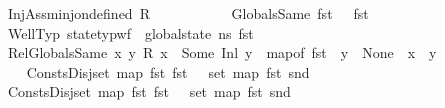 \begin{isabellebody}
\ \ \ \ \ \ \ \ \ \ InjAssm{\isacharcolon}{\kern0pt}{\isachardoublequoteopen}inj{\isacharunderscore}{\kern0pt}on{\isacharunderscore}{\kern0pt}defined\ R{\isachardoublequoteclose}\ \isanewline
\ \ \ \ \ \ \ \ \ \ GlobalsSame{\isacharcolon}{\kern0pt}\ {\isachardoublequoteopen}fst\ {\isasymLambda}\ {\isacharequal}{\kern0pt}\ fst\ {\isasymLambda}{\isacharprime}{\kern0pt}{\isachardoublequoteclose}\ \isanewline
\ \ \ \ \ \ \ \ \ \ WellTyp{\isacharcolon}{\kern0pt}\ {\isachardoublequoteopen}{\isacharparenleft}{\kern0pt}state{\isacharunderscore}{\kern0pt}typ{\isacharunderscore}{\kern0pt}wf\ {\isasymOmega}\ {\isacharparenleft}{\kern0pt}global{\isacharunderscore}{\kern0pt}state\ ns{\isacharparenright}{\kern0pt}\ {\isacharparenleft}{\kern0pt}fst\ {\isasymLambda}{\isacharparenright}{\kern0pt}{\isacharparenright}{\kern0pt}{\isachardoublequoteclose}\ \isanewline
\ \ \ \ \ \ \ \ \ \ RelGlobalsSame{\isacharcolon}{\kern0pt}\ {\isachardoublequoteopen}{\isasymforall}x\ y{\isachardot}{\kern0pt}\ R\ x\ {\isacharequal}{\kern0pt}\ Some\ {\isacharparenleft}{\kern0pt}Inl\ y{\isacharparenright}{\kern0pt}\ {\isasymlongrightarrow}\ map{\isacharunderscore}{\kern0pt}of\ {\isacharparenleft}{\kern0pt}fst\ {\isasymLambda}{\isacharprime}{\kern0pt}{\isacharparenright}{\kern0pt}\ y\ {\isasymnoteq}\ None\ {\isasymlongrightarrow}\ x\ {\isacharequal}{\kern0pt}\ y{\isachardoublequoteclose}\ \ \isanewline
\ \ \ \ \ \ \ \ \ \ ConstsDisj{\isacharcolon}{\kern0pt}{\isachardoublequoteopen}set\ {\isacharparenleft}{\kern0pt}map\ fst\ {\isacharparenleft}{\kern0pt}fst\ {\isasymLambda}{\isacharparenright}{\kern0pt}{\isacharparenright}{\kern0pt}\ {\isasyminter}\ set\ {\isacharparenleft}{\kern0pt}map\ fst\ {\isacharparenleft}{\kern0pt}snd\ {\isasymLambda}{\isacharparenright}{\kern0pt}{\isacharparenright}{\kern0pt}\ {\isacharequal}{\kern0pt}\ {\isacharbraceleft}{\kern0pt}{\isacharbraceright}{\kern0pt}{\isachardoublequoteclose}\ \isanewline
\ \ \ \ \ \ \ \ \ \ ConstsDisj{}{\isacharcolon}{\kern0pt}{\isachardoublequoteopen}set\ {\isacharparenleft}{\kern0pt}map\ fst\ {\isacharparenleft}{\kern0pt}fst\ {\isasymLambda}{\isacharprime}{\kern0pt}{\isacharparenright}{\kern0pt}{\isacharparenright}{\kern0pt}\ {\isasyminter}\ set\ {\isacharparenleft}{\kern0pt}map\ fst\ {\isacharparenleft}{\kern0pt}snd\ {\isasymLambda}{\isacharprime}{\kern0pt}{\isacharparenright}{\kern0pt}{\isacharparenright}{\kern0pt}\ {\isacharequal}{\kern0pt}\ {\isacharbraceleft}{\kern0pt}{\isacharbraceright}{\kern0pt}{\isachardoublequoteclose}\isanewline

\end{isabellebody}
